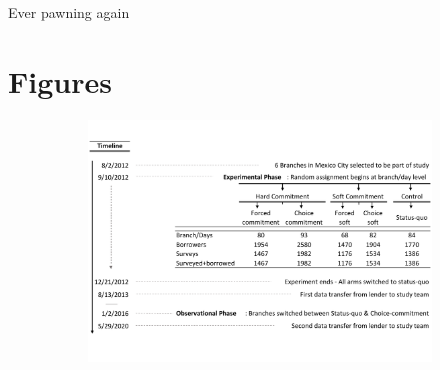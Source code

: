 \documentclass[oneside,11pt]{article}
\begin{document}
{\cleardoublepage

\begin{table}[H]
\caption{Ever pawning again}
\label{repeat_loans}
\begin{center}
\scriptsize{}
\end{center}
 \scriptsize

\end{table}

\cleardoublepage




\section{Figures}



\begin{figure}[H]
     \caption{Experiment description}
    \label{exp_description}
\begin{center}
\begin{subfigure}{\textwidth}
        \includegraphics[width=\textwidth]{Figuras/consort.pdf}
    \end{subfigure}
  \end{center}
    \scriptsize 
\end{figure}



}
\end{document}
